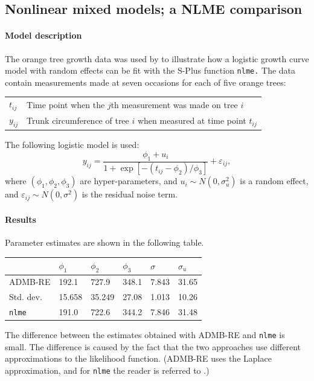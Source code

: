 \documentclass[12pt,letter,reqno]{book}
\begin{document}
\subsection{Nonlinear mixed models; a NLME comparison}
\label{sec:orange}
\paragraph{Model description}
The orange tree growth data was used by 
to illustrate how a logistic growth curve model with random effects can be
fit with the S-Plus function \texttt{nlme.} The data contain measurements made at
seven occasions for each of five orange trees:

\begin{center}
\begin{tabular}{ll}
$t_{ij}$ & Time point when the $j$th measurement was made on tree $i$ \\ 
$y_{ij}$ & Trunk circumference of tree $i$ when measured at time point $%
t_{ij}$%
\end{tabular}
\end{center}
The following logistic model is used:%
\[
y_{ij}=\frac{\phi_{1}+u_i}{1+\exp \left[ -\left( t_{ij}-\phi_{2}\right)
/\phi_{3}\right] }+\varepsilon_{ij}, 
\]%
where $(\phi_{1},\phi_{2},\phi_{3})$ are hyper-parameters, and $u_i\sim
N(0,\sigma_{u}^{2})$ is a random effect, and $\varepsilon_{ij}\sim
N(0,\sigma ^{2})$ is the residual noise term.

\paragraph{Results}
Parameter estimates are shown in the following table.
\begin{center}
\begin{tabular}{llllll}
& $\phi_{1}$ & $\phi_{2}$ & $\phi_{3}$ & $\sigma $ & $\sigma_{u}$ \\ 
\hline
ADMB-RE & 192.1 & 727.9 & 348.1 & 7.843 & 31.65 \\ 
Std. dev. & 15.658 & 35.249 & 27.08 & 1.013 & 10.26 \\ 
\texttt{nlme} & 191.0 & 722.6 & 344.2 & 7.846 & 31.48%
\end{tabular}
\end{center}
The difference between the estimates obtained with ADMB-RE and \texttt{nlme}
is small. The difference is caused by the fact that the two approaches use
different approximations to the likelihood function. (ADMB-RE uses the
Laplace approximation, and for \texttt{nlme} the reader is referred to %
\cite[Ch. 7]{pinh:bate:2000}.)
\end{document}
